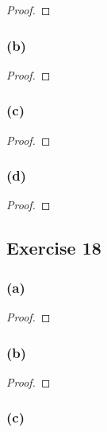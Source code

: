\documentclass[14pt]{extarticle}
\begin{document}
\begin{proof}

\end{proof}

\subsubsection{(b)}

\begin{proof}

\end{proof}

\subsubsection{(c)}

\begin{proof}

\end{proof}

\subsubsection{(d)}

\begin{proof}

\end{proof}

\subsection{Exercise 18}

\subsubsection{(a)}

\begin{proof}

\end{proof}

\subsubsection{(b)}

\begin{proof}

\end{proof}

\subsubsection{(c)}
\end{document}
